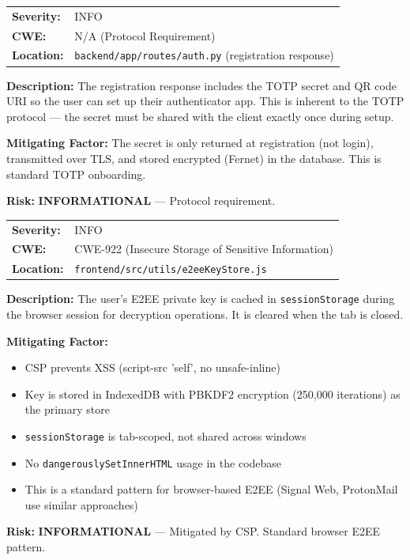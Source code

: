 \documentclass[11pt,a4paper]{article}
\begin{document}
\begin{tcolorbox}[colback=info!5, colframe=info, title=\textbf{S-06: TOTP Secret Returned During Registration}]
\begin{tabularx}{\textwidth}{lX}
\textbf{Severity:} & \textcolor{info}{INFO} \\
\textbf{CWE:} & N/A (Protocol Requirement) \\
\textbf{Location:} & \texttt{backend/app/routes/auth.py} (registration response) \\
\end{tabularx}

\textbf{Description:} The registration response includes the TOTP secret and QR code URI so the user can set up their authenticator app. This is inherent to the TOTP protocol --- the secret must be shared with the client exactly once during setup.

\textbf{Mitigating Factor:} The secret is only returned at registration (not login), transmitted over TLS, and stored encrypted (Fernet) in the database. This is standard TOTP onboarding.

\textbf{Risk:} \textcolor{info}{\textbf{INFORMATIONAL}} --- Protocol requirement.
\end{tcolorbox}

\begin{tcolorbox}[colback=info!5, colframe=info, title=\textbf{S-07: E2EE Private Key in Browser sessionStorage}]
\begin{tabularx}{\textwidth}{lX}
\textbf{Severity:} & \textcolor{info}{INFO} \\
\textbf{CWE:} & CWE-922 (Insecure Storage of Sensitive Information) \\
\textbf{Location:} & \texttt{frontend/src/utils/e2eeKeyStore.js} \\
\end{tabularx}

\textbf{Description:} The user's E2EE private key is cached in \texttt{sessionStorage} during the browser session for decryption operations. It is cleared when the tab is closed.

\textbf{Mitigating Factor:}
\begin{itemize}[nosep]
  \item CSP prevents XSS (script-src 'self', no unsafe-inline)
  \item Key is stored in IndexedDB with PBKDF2 encryption (250,000 iterations) as the primary store
  \item \texttt{sessionStorage} is tab-scoped, not shared across windows
  \item No \texttt{dangerouslySetInnerHTML} usage in the codebase
  \item This is a standard pattern for browser-based E2EE (Signal Web, ProtonMail use similar approaches)
\end{itemize}

\textbf{Risk:} \textcolor{info}{\textbf{INFORMATIONAL}} --- Mitigated by CSP. Standard browser E2EE pattern.
\end{tcolorbox}
\end{document}
